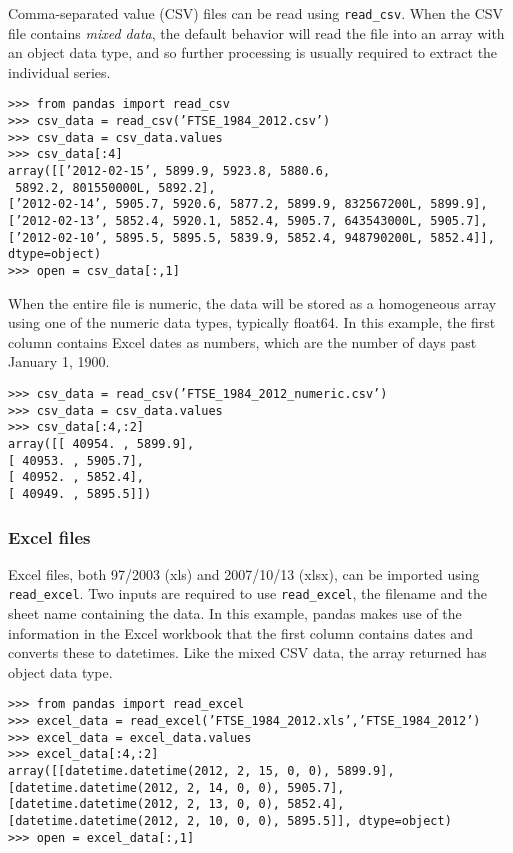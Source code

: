 \documentclass[KSmain.tex]{subfiles}
\begin{document}
Comma-separated value (CSV) files can be read using \texttt{read\_csv}. When the CSV file contains \textit{mixed data},
the default behavior will read the file into an array with an object data type, and so further processing is
usually required to extract the individual series.

\begin{framed}
\begin{verbatim}
>>> from pandas import read_csv
>>> csv_data = read_csv(’FTSE_1984_2012.csv’)
>>> csv_data = csv_data.values
>>> csv_data[:4]
array([[’2012-02-15’, 5899.9, 5923.8, 5880.6, 
 5892.2, 801550000L, 5892.2],
[’2012-02-14’, 5905.7, 5920.6, 5877.2, 5899.9, 832567200L, 5899.9],
[’2012-02-13’, 5852.4, 5920.1, 5852.4, 5905.7, 643543000L, 5905.7],
[’2012-02-10’, 5895.5, 5895.5, 5839.9, 5852.4, 948790200L, 5852.4]], 
dtype=object)
>>> open = csv_data[:,1]
\end{verbatim}
\end{framed}

When the entire file is numeric, the data will be stored as a homogeneous array using one of the numeric
data types, typically float64. In this example, the first column contains Excel dates as numbers, which are
the number of days past January 1, 1900.
\begin{framed}
	\begin{verbatim}
>>> csv_data = read_csv(’FTSE_1984_2012_numeric.csv’)
>>> csv_data = csv_data.values
>>> csv_data[:4,:2]
array([[ 40954. , 5899.9],
[ 40953. , 5905.7],
[ 40952. , 5852.4],
[ 40949. , 5895.5]])
\end{verbatim}
\end{framed}
\subsubsection{Excel files}
Excel files, both 97/2003 (xls) and 2007/10/13 (xlsx), can be imported using \texttt{read\_excel}. Two inputs are
required to use \texttt{read\_excel}, the filename and the sheet name containing the data. In this example, pandas
makes use of the information in the Excel workbook that the first column contains dates and converts
these to datetimes. Like the mixed CSV data, the array returned has object data type.
\begin{framed}
\begin{verbatim}
>>> from pandas import read_excel
>>> excel_data = read_excel(’FTSE_1984_2012.xls’,’FTSE_1984_2012’)
>>> excel_data = excel_data.values
>>> excel_data[:4,:2]
array([[datetime.datetime(2012, 2, 15, 0, 0), 5899.9],
[datetime.datetime(2012, 2, 14, 0, 0), 5905.7],
[datetime.datetime(2012, 2, 13, 0, 0), 5852.4],
[datetime.datetime(2012, 2, 10, 0, 0), 5895.5]], dtype=object)
>>> open = excel_data[:,1]
\end{verbatim}
\end{framed}
\newpage
\end{document}
